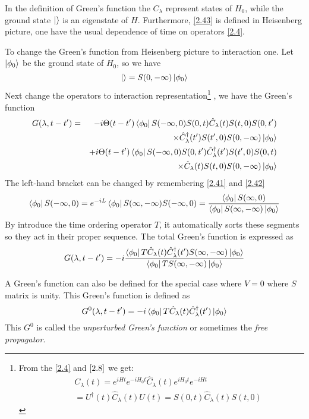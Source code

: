 In the definition of Green's function the $C_\lambda$ represent states of $H_0$, while the ground state $\ket{}$ is an eigenstate of $H$.
Furthermore, \eqref{2.43} is defined in Heisenberg picture, one have the usual dependence of time on operators \eqref{2.4}.

To change the Green's function from Heisenberg picture to interaction one.
Let $\ket{\phi_0}$ be the ground state of $H_0$, so we have
\begin{equation}
  \ket{} = S(0,-\infty) \ket{\phi_0} \label{2.48}
\end{equation}
Next change the operators to interaction representation\footnote{
From the \eqref{2.4} and $\eqref{2.8}$ we get:
\begin{eqnarray*}
  &&C_\lambda(t) = e^{iHt}e^{-iH_0 t}\hat{C}_\lambda(t)e^{iH_0 t}e^{-iHt} \\
  &&= U^\dagger(t)\hat{C}_\lambda(t)U(t) = S(0,t)\hat{C}_\lambda(t)S(t,0)
\end{eqnarray*}
}
, we have the Green's function
\begin{eqnarray*}
G(\lambda,t-t') &=& -i\Theta(t-t')\bra{\phi_0} S(-\infty,0)S(0,t)\hat{C}_\lambda(t)S(t,0) S(0,t')\\
&&\times\hat{C}_\lambda^\dagger(t') S(t',0)S(0,-\infty)\ket{\phi_0} \\
&&+ i\Theta(t-t') \bra{\phi_0} S(-\infty,0) S(0,t')\hat{C}_\lambda^\dagger(t')S(t',0) S(0,t)\\
&&\times\hat{C}_\lambda(t)S(t,0)S(0,-\infty)\ket{\phi_0}
\end{eqnarray*}
The left-hand bracket can be changed by remembering \eqref{2.41} and \eqref{2.42}
\begin{equation*}
  \bra{\phi_0}S(-\infty,0) = e^{-iL}\bra{\phi_0}S(\infty,-\infty) S(-\infty,0 ) = \frac{\bra{\phi_0}S(\infty,0)}{\bra{\phi_0}S(\infty,-\infty)\ket{\phi_0}}
\end{equation*}
By introduce the time ordering operator $T$, it automatically sorts these segments so they act in their proper sequence.
The total Green's function is expressed as
\begin{equation}
  G(\lambda, t-t')=-i \frac{\bra{\phi_0}T \hat{C}_\lambda(t) \hat{C}^\dagger_\lambda(t') S(\infty,-\infty) \ket{\phi_0}}{\bra{\phi_0}T S(\infty,-\infty)\ket{\phi_0}} \label{2.50}
\end{equation}

A Green's function can also be defined for the special case where $V=0$ where $S$ matrix is unity.
This Green's function is defined as
\begin{equation}
  G^0(\lambda,t-t') = -i \bra{\phi_0} T \hat{C}_\lambda(t) \hat{C}^\dagger_\lambda (t') \ket{\phi_0} \label{2.51}
\end{equation}
This $G^0$ is called the \textit{unperturbed Green's function} or sometimes the \textit{free propagator}.

